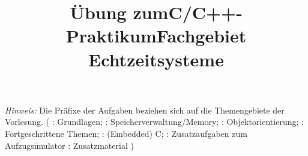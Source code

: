 
\title{Übung zum\linebreak[1]C/C++-Praktikum\linebreak[1] Fachgebiet Echtzeitsysteme}

\setcounter{section}{0}



\maketitle

\noindent\emph{Hinweis:} Die Präfixe der Aufgaben beziehen sich auf die Themengebiete der Vorlesung. (
\ExercisePrefixBasics{}: Grundlagen; 
\ExercisePrefixMemory{}: Speicherverwaltung/Memory;
\ExercisePrefixObjectOrientation{}: Objektorientierung;
\ExercisePrefixAdvanced{}: Fortgeschrittene Themen;
\ExercisePrefixEmbeddedC{}: (Embedded) C;
\ExercisePrefixElevator{}: Zusatzaufgaben zum Aufzugsimulator
\ExercisePrefixAdditionalInformation{}: Zusatzmaterial
)
\setcounter{tocdepth}{1}
\setlength\cftsecnumwidth{10em}
\setlength\cftbeforesecskip{.1em} %
\tableofcontents

\newpage






\newpage

\newpage

\newpage


\newpage
{}

\newpage

\newpage

\newpage


\newpage
{}

\newpage

\newpage

\newpage


\newpage
{}

\newpage

\newpage

\newpage

\newpage

\newpage

\newpage

\newpage


